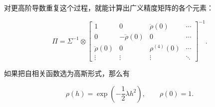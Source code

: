 对更高阶导数重复这个过程，就能计算出广义精度矩阵的各个元素：

\begin{equation}
\Pi
=
\Sigma^{-1}\otimes
\begin{bmatrix}
1 & 0 & \ddot\rho(0) & \cdots \\
0 & -\ddot\rho(0) & 0 & \cdots \\
\ddot\rho(0) & 0 & \rho^{(4)}(0) & \cdots \\
\vdots & \vdots & \vdots & \ddots
\end{bmatrix}^{-1}.
\tag{A.59}
\end{equation}

如果把自相关函数选为高斯形式，那么有

\begin{equation}
\rho(h) = \exp\!\left(-\frac{1}{2}\lambda h^2\right),
\qquad
\rho(0)=1.
\tag{A.60}
\end{equation}
